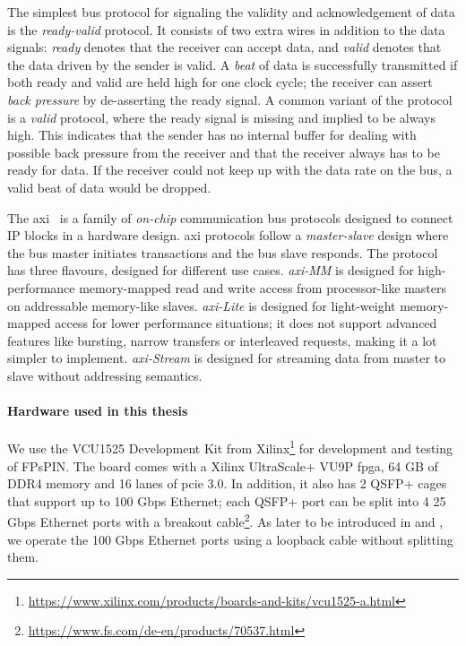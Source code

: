 The simplest bus protocol for signaling the validity and acknowledgement of data is the \emph{ready-valid} protocol.  It consists of two extra wires in addition to the data signals: \emph{ready} denotes that the receiver can accept data, and \emph{valid} denotes that the data driven by the sender is valid.  A \emph{beat} of data is successfully transmitted if both ready and valid are held high for one clock cycle; the receiver can assert \emph{back pressure} by de-asserting the ready signal.  A common variant of the protocol is a \emph{valid} protocol, where the ready signal is missing and implied to be always high.  This indicates that the sender has no internal buffer for dealing with possible back pressure from the receiver and that the receiver always has to be ready for data.  If the receiver could not keep up with the data rate on the bus, a valid beat of data would be dropped.

The \ac{axi}~\cite{arm_limited_amba_2003, arm_limited_amba_2010} is a family of \emph{on-chip} communication bus protocols designed to connect IP blocks in a hardware design.  \ac{axi} protocols follow a \emph{master-slave} design where the bus master initiates transactions and the bus slave responds.  The protocol has three flavours, designed for different use cases.  \emph{\ac{axi}-MM} is designed for high-performance memory-mapped read and write access from processor-like masters on addressable memory-like slaves.  \emph{\ac{axi}-Lite} is designed for light-weight memory-mapped access for lower performance situations; it does not support advanced features like bursting, narrow transfers or interleaved requests, making it a lot simpler to implement.  \emph{\ac{axi}-Stream} is designed for streaming data from master to slave without addressing semantics.

\paragraph{Hardware used in this thesis} We use the VCU1525 Development Kit from Xilinx\footnote{\url{https://www.xilinx.com/products/boards-and-kits/vcu1525-a.html}} for development and testing of FPsPIN.  The board comes with a Xilinx UltraScale+ VU9P \ac{fpga}, 64 GB of DDR4 memory and 16 lanes of \ac{pcie} 3.0.  In addition, it also has 2 QSFP+ cages that support up to 100 Gbps Ethernet; each QSFP+ port can be split into 4 25 Gbps Ethernet ports with a breakout cable\footnote{\url{https://www.fs.com/de-en/products/70537.html}}.  As later to be introduced in  and , we operate the 100 Gbps Ethernet ports using a loopback cable without splitting them.

